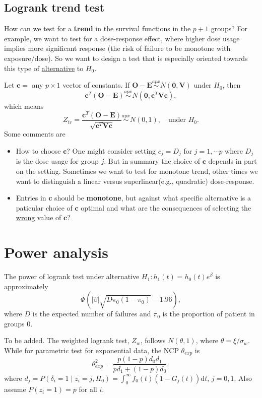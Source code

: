 \documentclass[a4paper,12pt]{article}
\begin{document}
\subsection{Logrank trend test}
\label{sec:logrank-trend-test}


How can we test for a \textbf{trend} in the survival functions in the $p+1$ groups? For example, we want to test for a dose-response effect, where higher dose usage implies more significant response (the risk of failure to be monotone with exposure/dose). So we want to design a test that is especially oriented towards this type of \underline{alternative} to $H_0$.
\par
Let $\bm{c} = $ any $p\times 1$ vector of constants. If $\bm{O} - \bm{E} \overset{apx}{\sim} N\left(\bm{0}, \bm{V}\right)$ under $H_0$, then
\[
  \bm{c}^T\left(\bm{O} - \bm{E}\right)
  \overset{apx}{\sim}
  N\left(\bm{0}, \bm{c}^T\bm{V}\bm{c}\right)
  ,
\]
which means
\[
  Z_{tr} = \frac{
    \bm{c}^T\left(\bm{O} - \bm{E}\right)
  }{
    \sqrt{\bm{c}^T\bm{V}\bm{c}}
  }
  \overset{apx}{\sim}
  N\left(0, 1\right)
  ,\quad\text{under }H_0.
\]
Some comments are
\begin{itemize}
\item How to choose $\bm{c}$? One might consider setting $c_j = D_j$ for $j = 1, \cdots p$ where $D_j$ is the dose usage for group $j$. But in summary the choice of $\bm{c}$ depends in part on the setting. Sometimes we want to test for monotone trend, other times we want to distinguish a linear versus superlinear(e.g., quadratic) dose-response. 
\item Entries in $\bm{c}$ should be \textbf{monotone}, but against what specific alternative is a paticular choice of $\bm{c}$ optimal and what are the consequences of selecting the \underline{wrong} value of $\bm{c}$?
\end{itemize}

\section{Power analysis}
\label{sec:power-analysis}

The power of logrank test under alternative $H_1: h_1\left(t\right) = h_0\left(t\right)e^\beta$ is approximately
\[
  \Phi\left(
    \left|\beta\right|
    \sqrt{D\pi_0\left(1 - \pi_0\right)}
    - 1.96
  \right)
  ,
\]
where $D$ is the expected number of failures and $\pi_0$ is the proportion of patient in groups 0.

{\color{red}To be added.}
The weighted logrank test, $Z_w$, follows $N\left(\theta, 1\right)$, where $\theta = \xi / \sigma_w$. While for parametric test for exponential data, the NCP $\theta_{exp}$ is
\[
  \theta^2_{exp}
  = \frac{
    p\left(1 - p\right)d_0d_1
  }{
    pd_1 + \left(1 - p\right)d_0
  }
  ,
\]
where $d_j = P\left(\delta_i = 1\middle|z_i = j, H_0\right) = \int_0^{\infty}f_0\left(t\right)\left(1 - G_j\left(t\right)\right)\mathrm{d}t$, $j = 0, 1$. Also assume $P\left(z_i = 1\right) = p$ for all $i$.




\end{document}
